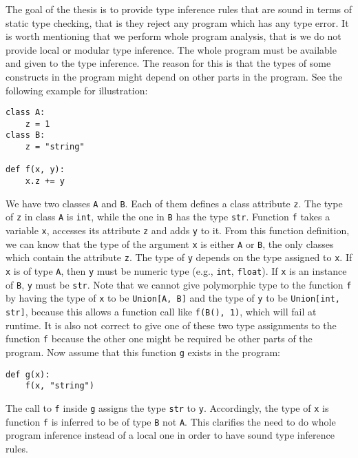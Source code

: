 The goal of the thesis is to provide type inference rules that are sound in terms of static type checking, that is they reject any program which has any type error. It is worth mentioning that we perform whole program analysis, that is we do not provide local or modular type inference. The whole program must be available and given to the type inference. The reason for this is that the types of some constructs in the program might depend on other parts in the program. See the following example for illustration:
\begin{lstlisting}
class A:
	z = 1
class B:
	z = "string"
	
def f(x, y):
	x.z += y
\end{lstlisting}
We have two classes \lstinline|A| and \lstinline|B|. Each of them defines a class attribute \lstinline|z|. The type of \lstinline|z| in class \lstinline|A| is \lstinline|int|, while the one in \lstinline|B| has the type \lstinline|str|. Function \lstinline|f| takes a variable \lstinline|x|, accesses its attribute \lstinline|z| and adds \lstinline|y| to it. From this function definition, we can know that the type of the argument \lstinline|x| is either \lstinline|A| or \lstinline|B|, the only classes which contain the attribute \lstinline|z|. The type of \lstinline|y| depends on the type assigned to \lstinline|x|. If \lstinline|x| is of type \lstinline|A|, then \lstinline|y| must be numeric type (e.g., \lstinline|int|, \lstinline|float|). If \lstinline|x| is an instance of \lstinline|B|, \lstinline|y| must be \lstinline|str|. Note that we cannot give polymorphic type to the function \lstinline|f| by having the type of \lstinline|x| to be \lstinline|Union[A, B]| and the type of \lstinline|y| to be \lstinline|Union[int, str]|, because this allows a function call like \lstinline|f(B(), 1)|, which will fail at runtime. It is also not correct to give one of these two type assignments to the function \lstinline|f| because the other one might be required be other parts of the program. Now assume that this function \lstinline|g| exists in the program:
\begin{lstlisting}
def g(x):
	f(x, "string")
\end{lstlisting}
The call to \lstinline|f| inside \lstinline|g| assigns the type \lstinline|str| to \lstinline|y|. Accordingly, the type of \lstinline|x| is function \lstinline|f| is inferred to be of type \lstinline|B| not \lstinline|A|. This clarifies the need to do whole program inference instead of a local one in order to have sound type inference rules.

